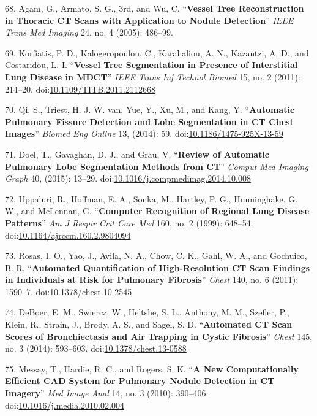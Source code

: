 \documentclass[11pt,]{article}
\begin{document}
68. Agam, G., Armato, S. G., 3rd, and Wu, C. ``\textbf{Vessel Tree
Reconstruction in Thoracic CT Scans with Application to Nodule
Detection}'' \emph{IEEE Trans Med Imaging} 24, no. 4 (2005): 486--99.

69. Korfiatis, P. D., Kalogeropoulou, C., Karahaliou, A. N., Kazantzi,
A. D., and Costaridou, L. I. ``\textbf{Vessel Tree Segmentation in
Presence of Interstitial Lung Disease in MDCT}'' \emph{IEEE Trans Inf
Technol Biomed} 15, no. 2 (2011): 214--20.
doi:\href{http://dx.doi.org/10.1109/TITB.2011.2112668}{10.1109/TITB.2011.2112668}

70. Qi, S., Triest, H. J. W. van, Yue, Y., Xu, M., and Kang, Y.
``\textbf{Automatic Pulmonary Fissure Detection and Lobe Segmentation in
CT Chest Images}'' \emph{Biomed Eng Online} 13, (2014): 59.
doi:\href{http://dx.doi.org/10.1186/1475-925X-13-59}{10.1186/1475-925X-13-59}

71. Doel, T., Gavaghan, D. J., and Grau, V. ``\textbf{Review of
Automatic Pulmonary Lobe Segmentation Methods from CT}'' \emph{Comput
Med Imaging Graph} 40, (2015): 13--29.
doi:\href{http://dx.doi.org/10.1016/j.compmedimag.2014.10.008}{10.1016/j.compmedimag.2014.10.008}

72. Uppaluri, R., Hoffman, E. A., Sonka, M., Hartley, P. G.,
Hunninghake, G. W., and McLennan, G. ``\textbf{Computer Recognition of
Regional Lung Disease Patterns}'' \emph{Am J Respir Crit Care Med} 160,
no. 2 (1999): 648--54.
doi:\href{http://dx.doi.org/10.1164/ajrccm.160.2.9804094}{10.1164/ajrccm.160.2.9804094}

73. Rosas, I. O., Yao, J., Avila, N. A., Chow, C. K., Gahl, W. A., and
Gochuico, B. R. ``\textbf{Automated Quantification of High-Resolution CT
Scan Findings in Individuals at Risk for Pulmonary Fibrosis}''
\emph{Chest} 140, no. 6 (2011): 1590--7.
doi:\href{http://dx.doi.org/10.1378/chest.10-2545}{10.1378/chest.10-2545}

74. DeBoer, E. M., Swiercz, W., Heltshe, S. L., Anthony, M. M., Szefler,
P., Klein, R., Strain, J., Brody, A. S., and Sagel, S. D.
``\textbf{Automated CT Scan Scores of Bronchiectasis and Air Trapping in
Cystic Fibrosis}'' \emph{Chest} 145, no. 3 (2014): 593--603.
doi:\href{http://dx.doi.org/10.1378/chest.13-0588}{10.1378/chest.13-0588}

75. Messay, T., Hardie, R. C., and Rogers, S. K. ``\textbf{A New
Computationally Efficient CAD System for Pulmonary Nodule Detection in
CT Imagery}'' \emph{Med Image Anal} 14, no. 3 (2010): 390--406.
doi:\href{http://dx.doi.org/10.1016/j.media.2010.02.004}{10.1016/j.media.2010.02.004}
\end{document}
